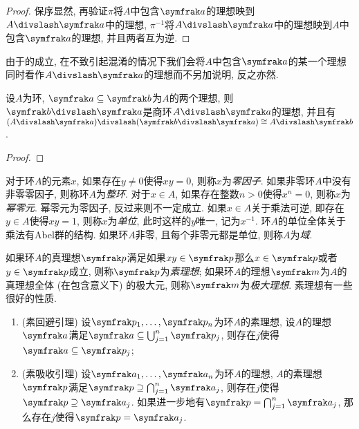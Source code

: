 \begin{proof}
  保序显然, 再验证$\pi$将$A$中包含$\ideal{a}$的理想映到$A{\divslash}\ideal{a}$中的理想, $\pi^{-1}$将$A{\divslash}\ideal{a}$中的理想映到$A$中包含$\ideal{a}$的理想, 并且两者互为逆.
\end{proof}

\begin{remark}
  由于的成立, 在不致引起混淆的情况下我们会将$A$中包含$\ideal{a}$的某一个理想同时看作$A{\divslash}\ideal{a}$的理想而不另加说明, 反之亦然.
\end{remark}

\begin{proposition}\label{prop:thirdisomorphism}
  设$A$为环, $\ideal{a}\subseteq\ideal{b}$为$A$的两个理想, 则$\ideal{b}{\divslash}\ideal{a}$是商环$A{\divslash}\ideal{a}$的理想, 并且有$(A{\divslash}\ideal{a}){\divslash}(\ideal{b}{\divslash}\ideal{a})\cong A{\divslash}\ideal{b}$.
\end{proposition}

\begin{proof}

\end{proof}

对于环$A$的元素$x$, 如果存在$y\neq 0$使得$xy=0$, 则称$x$为\emph{零因子}. 如果非零环$A$中没有非零零因子, 则称环$A$为\emph{整环}. 对于$x\in A$, 如果存在整数$n>0$使得$x^n = 0$, 则称$x$为\emph{幂零元}. 幂零元为零因子, 反过来则不一定成立. 如果$x\in A$关于乘法可逆, 即存在$y\in A$使得$xy=1$, 则称$x$为\emph{单位}, 此时这样的$y$唯一, 记为$x^{-1}$. 环$A$的单位全体关于乘法有Abel群的结构. 如果环$A$非零, 且每个非零元都是单位, 则称$A$为\emph{域}.

如果环$A$的真理想$\ideal{p}$满足如果$xy\in\ideal{p}$那么$x\in \ideal{p}$或者$y\in\ideal{p}$成立, 则称$\ideal{p}$为\emph{素理想}; 如果环$A$的理想$\ideal{m}$为$A$的真理想全体 (在包含意义下) 的极大元, 则称$\ideal{m}$为\emph{极大理想}. 素理想有一些很好的性质.

\begin{proposition}\label{prop:prime}\leavevmode
  \begin{enumerate}
    \item\label{enum:prop-prime-avoid}(素回避引理) 设$\ideal{p}_1, \dotsc, \ideal{p}_n$为环$A$的素理想, 设$A$的理想$\ideal{a}$满足$\ideal{a}\subseteq\bigcup_{j=1}^n\ideal{p}_j$, 则存在$j$使得$\ideal{a}\subseteq \ideal{p}_j$;
    \item\label{enum:prop-prime-absorb}(素吸收引理) 设$\ideal{a}_1, \dotsc, \ideal{a}_n$为环$A$的理想, $A$的素理想$\ideal{p}$满足$\ideal{p}\supseteq\bigcap_{j=1}^n\ideal{a}_j$, 则存在$j$使得$\ideal{p}\supseteq\ideal{a}_j$. 如果进一步地有$\ideal{p}=\bigcap_{j=1}^n\ideal{a}_j$, 那么存在$j$使得$\ideal{p}=\ideal{a}_j$.
  \end{enumerate}
\end{proposition}

